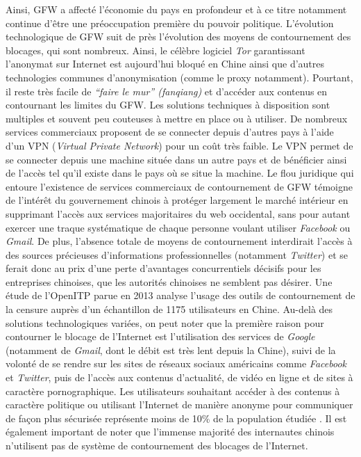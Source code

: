 Ainsi, GFW a affecté l’économie du pays en profondeur et à ce titre notamment continue d’être une préoccupation première du pouvoir politique. L’évolution technologique de GFW suit de près l’évolution des moyens de contournement des blocages, qui sont nombreux. Ainsi, le célèbre logiciel \textit{Tor} garantissant l’anonymat sur Internet est aujourd’hui bloqué en Chine \citep{Winter2012} ainsi que d’autres technologies communes d’anonymisation (comme le proxy notamment). Pourtant, il reste très facile de \textit{“faire le mur” (fanqiang)} et d’accéder aux contenus en contournant les limites du GFW. Les solutions techniques à disposition sont multiples et souvent peu couteuses à mettre en place ou à utiliser. De nombreux services commerciaux proposent de se connecter depuis d’autres pays à l’aide d’un VPN (\textit{Virtual Private Network}) pour un coût très faible. Le VPN permet de se connecter depuis une machine située dans un autre pays et de bénéficier ainsi de l’accès tel qu’il existe dans le pays où se situe la machine. Le flou juridique qui entoure l’existence de services commerciaux de contournement de GFW témoigne de l’intérêt du gouvernement chinois à protéger largement le marché intérieur en supprimant l’accès aux services majoritaires du web occidental, sans pour autant exercer une traque systématique de chaque personne voulant utiliser \textit{Facebook} ou \textit{Gmail}. De plus, l’absence totale de moyens de contournement interdirait l’accès à des sources précieuses d’informations professionnelles (notamment \textit{Twitter}) et se ferait donc au prix d’une perte d’avantages concurrentiels décisifs pour les entreprises chinoises, que les autorités chinoises ne semblent pas désirer. Une étude de l’OpenITP parue en 2013 analyse l’usage des outils de contournement de la censure auprès d’un échantillon de 1175 utilisateurs en Chine. Au-delà des solutions technologiques variées, on peut noter que la première raison pour contourner le blocage de l’Internet est l’utilisation des services de \textit{Google} (notamment de \textit{Gmail}, dont le débit est très lent depuis la Chine), suivi de la volonté de se rendre sur les sites de réseaux sociaux américains comme \textit{Facebook} et \textit{Twitter}, puis de l’accès aux contenus d’actualité, de vidéo en ligne et de sites à caractère pornographique. Les utilisateurs souhaitant accéder à des contenus à caractère politique ou utilisant l’Internet de manière anonyme pour communiquer de façon plus sécurisée représente moins de 10\% de la population étudiée \citep{OpenITP2013}. Il est également important de noter que l’immense majorité des internautes chinois n’utilisent pas de système de contournement des blocages de l’Internet. 

